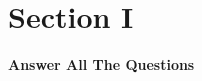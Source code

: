 \documentclass[12pt, addpoints,a5paper]{exam}
\begin{document}
	
\newpage
	
	\centering \section*{Section I}
	\begin{center}
		{\small \bfseries Answer All The Questions }
	\end{center}	
	
\end{document}
